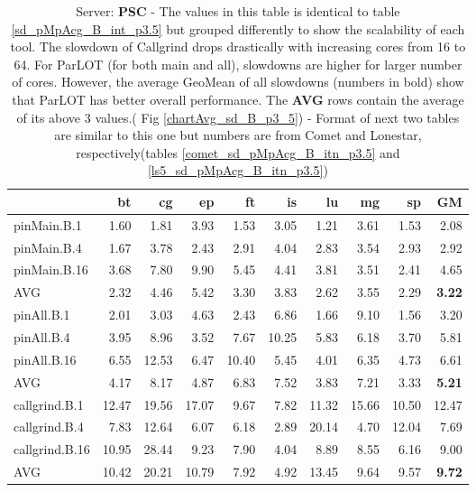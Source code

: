 \begin{table}[]

\caption{Server: \textbf{PSC} - The values in this table is identical to table \ref{sd_pMpAcg_B_int_p3.5} but grouped differently to show the scalability of each tool. The slowdown of Callgrind drops drastically with increasing cores from 16 to 64. For ParLOT (for both main and all), slowdowns are higher for larger number of cores. However, the average GeoMean of all slowdowns (numbers in bold) show that ParLOT has better overall performance. The \textbf{AVG} rows contain the average of its above 3 values.( Fig \ref{chartAvg_sd_B_p3_5}) - Format of next two tables are similar to this one but numbers are from Comet and Lonestar, respectively(tables \ref{comet_sd_pMpAcg_B_itn_p3.5} and \ref{ls5_sd_pMpAcg_B_itn_p3.5})}

\label{sd_pMpAcg_B_itn_p3.5}
\begin{center}
\begin{tabular}{|l|rrrrrrrr|r|}
\hline
                &    bt &    cg &    ep &    ft &    is &    lu &    mg &    sp &    GM \\
\hline
 pinMain.B.1    &  1.60 &  1.81 &  3.93 &  1.53 &  3.05 &  1.21 &  3.61 &  1.53 &  2.08 \\
 pinMain.B.4    &  1.67 &  3.78 &  2.43 &  2.91 &  4.04 &  2.83 &  3.54 &  2.93 &  2.92 \\
 pinMain.B.16   &  3.68 &  7.80 &  9.90 &  5.45 &  4.41 &  3.81 &  3.51 &  2.41 &  4.65 \\
 \hline
 AVG            &  2.32 &  4.46 &  5.42 &  3.30 &  3.83 &  2.62 &  3.55 &  2.29 &  \textbf{3.22} \\
 \hline
 pinAll.B.1     &  2.01 &  3.03 &  4.63 &  2.43 &  6.86 &  1.66 &  9.10 &  1.56 &  3.20 \\
 pinAll.B.4     &  3.95 &  8.96 &  3.52 &  7.67 & 10.25 &  5.83 &  6.18 &  3.70 &  5.81 \\
 pinAll.B.16    &  6.55 & 12.53 &  6.47 & 10.40 &  5.45 &  4.01 &  6.35 &  4.73 &  6.61 \\
 \hline
 AVG            &  4.17 &  8.17 &  4.87 &  6.83 &  7.52 &  3.83 &  7.21 &  3.33 &  \textbf{5.21} \\
 \hline
 callgrind.B.1  & 12.47 & 19.56 & 17.07 &  9.67 &  7.82 & 11.32 & 15.66 & 10.50 & 12.47 \\
 callgrind.B.4  &  7.83 & 12.64 &  6.07 &  6.18 &  2.89 & 20.14 &  4.70 & 12.04 &  7.69 \\
 callgrind.B.16 & 10.95 & 28.44 &  9.23 &  7.90 &  4.04 &  8.89 &  8.55 &  6.16 &  9.00 \\
 \hline
 AVG            & 10.42 & 20.21 & 10.79 &  7.92 &  4.92 & 13.45 &  9.64 &  9.57 &  \textbf{9.72} \\
 
\hline
\end{tabular}
\end{center}
\end{table}



